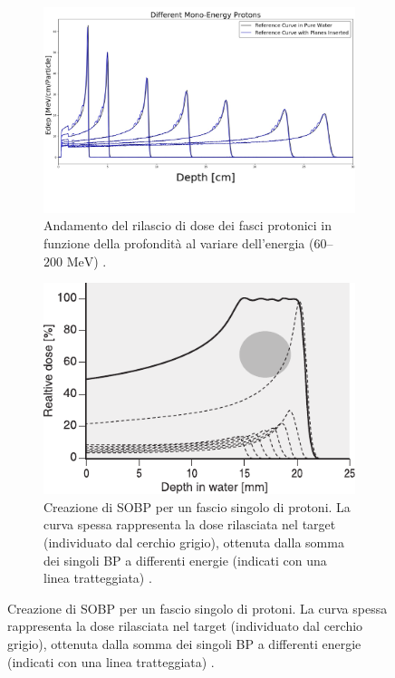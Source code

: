 \documentclass[12pt,a4paper,twoside]{report}
\begin{document}
		\begin{figure}[H]
		\centering
		\begin{subfigure}[t]{0.49\textwidth}
			\centering
			\includegraphics[width=\textwidth, scale=0.50]{bragg_peak_energies.jpg}
			\caption{Andamento del rilascio di dose dei fasci protonici in funzione della profondità al variare dell'energia ($60$--$200\mbox{ MeV}$) \cite{LauDissertation}.}
			\label{fig:bragg_peak_energies}
		\end{subfigure}
		\hfill
		\begin{subfigure}[t]{0.49\textwidth}
			\centering
			\includegraphics[width=\textwidth, scale=0.50]{sobp.pdf}
			\caption{Creazione di SOBP per un fascio singolo di protoni. La curva spessa rappresenta la dose rilasciata nel target (individuato dal cerchio grigio), ottenuta dalla somma dei singoli BP a differenti energie (indicati con una linea tratteggiata) \cite{Bomford2002-wo}.}

\end{subfigure}
\end{figure}
\end{document}
